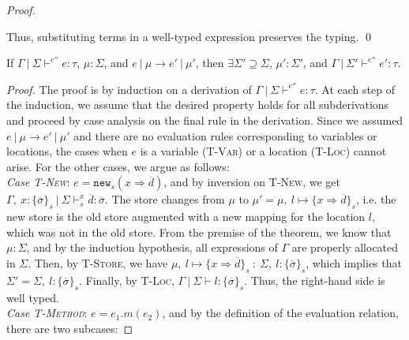 \documentclass{llncs}
\newcommand{\keywadj}[1]{\mathtt{#1}}
\begin{document}
\begin{proof}
\begin{pcases}
\end{pcases}

\noindent Thus, substituting terms in a well-typed expression preserves the typing. \qed
\end{proof}

\vspace{6pt}

\begin{theorem}[Preservation]
If $\Gamma~|~\Sigma \vdash^{e''} e : \tau$, $\mu : \Sigma$, and $e~|~\mu \longrightarrow e'~|~\mu'$, then $\exists \Sigma' \supseteq \Sigma$, $\mu' : \Sigma'$, and $\Gamma~|~\Sigma' \vdash^{e''} e' : \tau$.

\end{theorem}

\begin{proof} The proof is by induction on a derivation of $\Gamma~|~\Sigma \vdash^{e''} e : \tau$. At each step of the induction, we assume that the desired property holds for all subderivations and proceed by case analysis on the final rule in the derivation. Since we assumed $e~|~\mu \longrightarrow e'~|~\mu'$ and there are no evaluation rules corresponding to variables or locations, the cases when $e$ is a variable (\textsc{T-Var}) or a location (\textsc{T-Loc}) cannot arise. For the other cases, we argue as follows:
\\

\noindent\textit{Case \textsc{T-New}}:
$e = \keywadj{new}_{s}(x \Rightarrow \overline{d})$, and by inversion on \textsc{T-New}, we get $\Gamma,~x : \{ \overline{\sigma} \}_{s}~|~\Sigma \vdash^x_s \overline{d} : \overline{\sigma}$. The store changes from $\mu$ to $\mu' = \mu,~l \mapsto \{ x \Rightarrow \overline{d} \}_s$, i.e. the new store is the old store augmented with a new mapping for the location $l$, which was not in the old store. From the premise of the theorem, we know that $\mu : \Sigma$, and by the induction hypothesis, all expressions of $\Gamma$ are properly allocated in $\Sigma$. Then, by \textsc{T-Store}, we have $\mu,~l \mapsto \{ x \Rightarrow \overline{d} \}_s~:~\Sigma,~l : \{ \overline{\sigma} \}_s$, which implies that $\Sigma' = \Sigma,~l : \{ \overline{\sigma} \}_s$. Finally, by \textsc{T-Loc}, $\Gamma~|~\Sigma \vdash l : \{ \overline{\sigma} \}_s$. Thus, the right-hand side is well typed.
\\

\noindent\textit{Case \textsc{T-Method}}:
$e = e_1.m(e_2)$, and by the definition of the evaluation relation, there are two subcases:


\end{proof}
\end{document}
